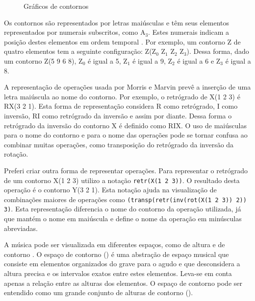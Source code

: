 \begin{figure}
  \centering
  \subfloat[contorno P(0 3 1 2)]{
    \texttt{[image: c-5968]}
    \label{fig:cseg-0312}
  }
  \subfloat[contorno Q(0 2 1 3)]{
    \texttt{[image: c-0213]}
    \label{fig:cseg-0213}
  }
  \subfloat[contorno R(2 0 3 1)]{
    \texttt{[image: c-2031]}
    \label{fig:cseg-2031}
  }
  \caption{Gráficos de contornos}
  \label{fig:graficos-cseg}
\end{figure}

Os contornos são representados por letras maiúsculas e têm seus
elementos representados por numerais subscritos, como A$_3$. Estes
numerais indicam a posição destes elementos em ordem temporal
\cite{marvin.ea87:relating}. Por exemplo, um contorno Z de quatro
elementos tem a seguinte configuração: Z(Z$_0$ Z$_1$ Z$_2$
Z$_3$). Dessa forma, dado um contorno Z(5 9 6 8), Z$_0$ é igual a 5,
Z$_1$ é igual a 9, Z$_2$ é igual a 6 e Z$_3$ é igual a 8.

A representação de operações usada por Morris e Marvin prevê a
inserção de uma letra maiúscula ao nome do contorno. Por exemplo, o
retrógrado de X(1 2 3) é RX(3 2 1). Esta forma de representação
considera R como retrógrado, I como inversão, RI como retrógrado da
inversão e assim por diante. Dessa forma o retrógrado da inversão do
contorno X é definido como RIX. O uso de maiúsculas para o nome do
contorno e para o nome das operações pode se tornar confusa ao
combinar muitas operações, como transposição do retrógrado da inversão
da rotação.

Preferi criar outra forma de representar operações. Para representar o
retrógrado de um contorno X(1 2 3) utilizo a notação
\verb!retr(X(1 2 3))!. O resultado desta operação é o contorno Y(3 2
1). Esta notação ajuda na visualização de combinações maiores de
operações como \verb!(transp(retr(inv(rot(X(1 2 3)) 2)) 3)!. Esta
representação diferencia o nome do contorno da operação utilizada, já
que mantém o nome em maiúscula e define o nome da operação em
minúsculas abreviadas.

A música pode ser visualizada em diferentes espaços, como de altura e
de contorno \cite{morris87:composition}.
O espaço de contorno () é uma abstração
de espaço musical que consiste em elementos organizados do grave para
o agudo e que desconsidera a altura precisa e os intervalos exatos
entre estes elementos. Leva-se em conta apenas a relação entre as
alturas dos elementos. O espaço de contorno pode ser entendido como um
grande conjunto de alturas de contorno ().

